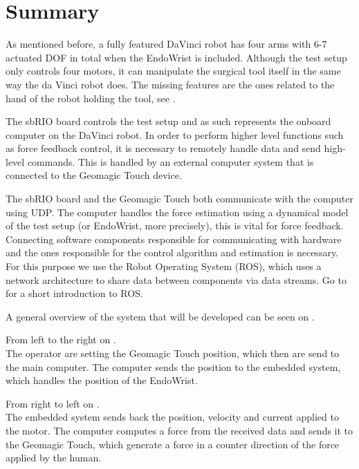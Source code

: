 \section{Summary}
As mentioned before, a fully featured DaVinci robot has four arms with 6-7 actuated \gls{DOF} in total when the EndoWrist is included.
Although the test setup only controls four motors, it can manipulate the surgical tool itself in the same way the da Vinci robot does. The missing features are the ones related to the hand of the robot holding the tool, see .

The sbRIO board controls the test setup and as such represents the onboard computer on the DaVinci robot.
In order to perform higher level functions such as force feedback control, it is necessary to remotely handle data and send high-level commands.
This is handled by an external computer system that is connected to the Geomagic Touch device.

The sbRIO board and the Geomagic Touch both communicate with the computer using UDP. The computer handles the force estimation using a dynamical model of the test setup (or EndoWrist, more precisely), this is vital for force feedback.
Connecting software components responsible for communicating with hardware and the ones responsible for the control algorithm and estimation is necessary.
For this purpose we use the Robot Operating System (ROS), which uses a network architecture to share data between components via data streams. Go to  for a short introduction to ROS.

A general overview of the system that will be developed can be seen on .






From left to the right on .\\ 
The operator are setting the Geomagic Touch position, which then are send to the main computer. The computer sends the position to the embedded system, which handles the position of the EndoWrist.

From right to left on .\\
The embedded system sends back the position, velocity and current applied to the motor. The computer computes a force from the received data and sends it to the Geomagic Touch, which generate a force in a counter direction of the force applied by the human.

